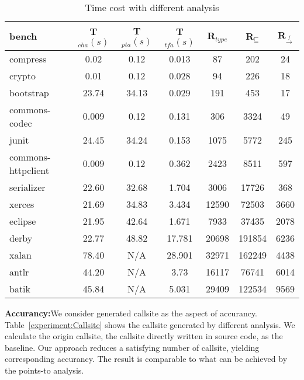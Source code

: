 \documentclass{llncs}
\newcommand{\less}{\sqsubseteq}
\newcommand{\hflow}{\rightarrow}
\newcommand{\lhflow}[1]{\stackrel{#1}{\hflow}}
\begin{document}
\begin{table}[!htbp]\centering
\caption{Time cost with different analysis}
\begin{tabular}{lcccccc}
	\hline
	\textbf{bench} & \textbf{T$_{cha}(s)$} & \textbf{T$_{pta}(s)$} & \textbf{T$_{tfa}(s)$} & \textbf{R$_{type}$} & \textbf{R$_{\less}$} & \textbf{R$_{\lhflow{f}}$} \\
	\hline
	compress & 0.02 & 0.12 & 0.013 & 87 & 202 & 24\\
	crypto & 0.01 & 0.12 & 0.028 & 94 & 226 & 18\\
	bootstrap & 23.74 & 34.13 & 0.029 & 191 & 453 & 17\\
	commons-codec & 0.009 & 0.12 & 0.131 & 306 & 3324 & 49\\
	junit & 24.45 & 34.24 & 0.153 & 1075 & 5772 & 245\\
	commons-httpclient & 0.009 & 0.12 & 0.362 & 2423 & 8511 & 597 \\
	serializer & 22.60 & 32.68 & 1.704 & 3006 & 17726 & 368\\
	xerces & 21.69 & 34.83 & 3.434 & 12590 & 72503 & 3660\\
	eclipse & 21.95 & 42.64 & 1.671 & 7933 & 37435 & 2078\\
	derby & 22.77 & 48.82 & 17.781 & 20698 & 191854 & 6236\\
	xalan & 78.40 & N/A & 28.901 & 32971 & 162249 & 4438\\
	antlr & 44.20 & N/A & 3.73 & 16117 & 76741 & 6014\\
	batik & 45.84 & N/A & 5.031 & 29409 & 122534 & 9569 \\
	\hline
\end{tabular}
\label{experiment:Time Cost}
\end{table}

\textbf{Accurancy:}We consider generated callsite as the aspect of accurancy. Table~\ref{experiment:Callsite} shows the callsite generated by different analysis. We calculate the origin callsite, the callsite directly written in source code, as the baseline. Our approach reduces a satisfying number of callsite, yielding corresponding accurancy. The result is comparable to what can be achieved by the points-to analysis.
\end{document}
